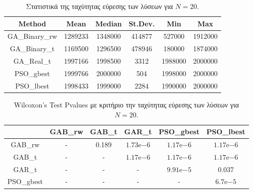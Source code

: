 \documentclass[12pt, a4paper]{article}
\newcommand{\en}{\selectlanguage{english}}
\newcommand{\gr}{\selectlanguage{greek}}
\begin{document}
\begin{table}[H]
	\centering
	\begin{tabular}{| c | c | c | c | c | c |}
		
		\hline
		\en Method & \en Mean & \en Median & \en St.Dev. & \en Min & \en Max \\
		
		\hline
		\en GA\_Binary\_rw & 1289233 & 1348000 & 414877 & 527000 & 1912000 \\ 
		
		\hline
		\en GA\_Binary\_t & 1169500 & 1296500 & 478946 & 180000 & 1874000 \\ 
		
		\hline
		\en GA\_Real\_t & 1997166 & 1998500 & 3312 & 1988000 & 2000000 \\ 
		
		\hline
		\en PSO\_gbest & 1999766 & 2000000 & 504 & 1998000 & 2000000\\ 
		
		\hline
		\en PSO\_lbest & 1998433 & 1999000 & 2284 & 1990000 & 2000000 \\ 
		
		\hline
		
	\end{tabular}
	\caption{Στατιστικά της ταχύτητας εύρεσης των λύσεων για $N = 20$.}
	\label{tab:iter_N20}
\end{table}

\begin{table}[H]
	\centering
	\begin{tabular}{| c | c | c | c | c | c |}
		
		\hline
		\en  & \en GAB\_rw & \en GAB\_t & \en GAR\_t & \en PSO\_gbest & \en PSO\_lbest\\
		
		\hline
		\en GAB\_rw & - & 0.189 & $1.73\mathrm{e}{-6}$ &  $1.17\mathrm{e}{-6}$ & $1.17\mathrm{e}{-6}$ \\ 
		
		\hline
		\en GAB\_t & - & - & $1.17\mathrm{e}{-6}$ & $1.17\mathrm{e}{-6}$ & $1.17\mathrm{e}{-6}$ \\ 
		
		\hline
		\en GAR\_t & - & - & - & $9.91\mathrm{e}{-5}$ & 0.037 \\ 
		
		\hline
		\en PSO\_gbest & - & - & - & - & $6.7\mathrm{e}{-5}$\\ 
		
		\hline
		
	\end{tabular}
	\caption{\en Wilcoxon's Test Pvalues \gr με κριτήριο την ταχύτητας εύρεσης των λύσεων για $N = 20$.}
	\label{tab:iter_pval_N20}
\end{table}
\end{document}
